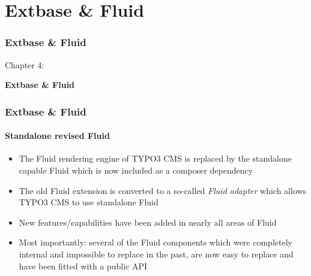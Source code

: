 %

\section{Extbase \& Fluid}
\begin{frame}[fragile]
	\frametitle{Extbase \& Fluid}

	\begin{center}\huge{Chapter 4:}\end{center}
	\begin{center}\huge{\color{typo3darkgrey}\textbf{Extbase \& Fluid}}\end{center}

\end{frame}


\begin{frame}[fragile]
	\frametitle{Extbase \& Fluid}
	\framesubtitle{Standalone revised Fluid}

	\lstset{basicstyle=\tiny\ttfamily}

	\begin{itemize}

		\item The Fluid rendering engine of TYPO3 CMS is replaced by the standalone
			capable Fluid which is now included as a composer dependency

		\item The old Fluid extension is converted to a so-called \textit{Fluid adapter}
			which allows TYPO3 CMS to use standalone Fluid

		\item New features/capabilities have been added in nearly all areas of Fluid

		\item Most importantly: several of the Fluid components which were completely
			internal and impossible to replace in the past, are now easy to
			replace and have been fitted with a public API

	\end{itemize}

\end{frame}

